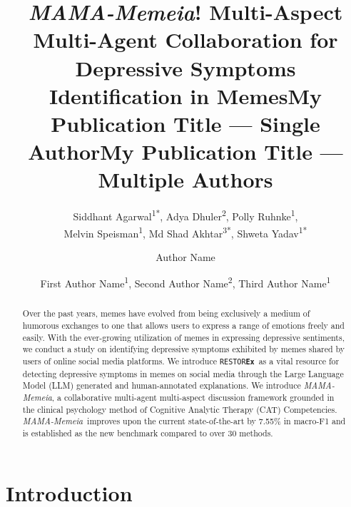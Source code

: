 \documentclass[letterpaper]{article} %
\title{\textit{MAMA-Memeia}! Multi-Aspect Multi-Agent Collaboration for Depressive Symptoms Identification in Memes}
\author{
    Siddhant Agarwal\textsuperscript{\rm 1*}, Adya Dhuler\textsuperscript{\rm 2}, Polly Ruhnke\textsuperscript{\rm 1},\\ Melvin Speisman\textsuperscript{\rm 1}, Md Shad Akhtar\textsuperscript{\rm 3*},  Shweta Yadav\textsuperscript{\rm 1*}
}
\title{My Publication Title --- Single Author}
\author {
    Author Name
}
\title{My Publication Title --- Multiple Authors}
\author {
    First Author Name\textsuperscript{\rm 1},
    Second Author Name\textsuperscript{\rm 2},
    Third Author Name\textsuperscript{\rm 1}
}
\newcommand{\dataset}{\texttt{RESTOR\textbf{Ex}}}
\newcommand{\model}{\textit{MAMA-Memeia}}
\begin{document}
\maketitle

\begin{abstract}
Over the past years, memes have evolved from being exclusively a medium of humorous exchanges to one that allows users to express a range of emotions freely and easily. With the ever-growing utilization of memes in expressing depressive sentiments, we conduct a study on identifying depressive symptoms exhibited by memes shared by users of online social media platforms. We introduce \dataset\ as a vital resource for detecting depressive symptoms in memes on social media through the Large Language Model (LLM) generated and human-annotated explanations. 
We introduce \model, a collaborative multi-agent multi-aspect discussion framework grounded in the clinical psychology method of Cognitive Analytic Therapy (CAT) Competencies. \model\ improves upon the current state-of-the-art by 7.55\% in macro-F1 and is established as the new benchmark compared to over 30 methods.%
\end{abstract}


\section{Introduction}

\end{document}
